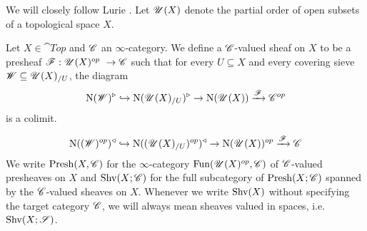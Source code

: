\documentclass[../../thesis.tex]{subfiles}
\begin{document}
We will closely follow Lurie \cite{HTT}.
Let $\mathscr{U}(X)$ denote the partial order of open subsets of a topological space $X$.
\begin{definition}\label{sheaf_on_top}
    Let $X \in \cat{Top}$ and $\mathscr{C}$ an $\infty$-category.
    We define a $\mathscr{C}$-valued sheaf on $X$ to be a presheaf $\F: \Open(X)^{op} \to \C$ such that for every $U\subseteq X$ and every covering sieve $\mathscr{W} \subseteq \mathscr{U}(X)_{/U}$, the diagram
    \[
        \mathrm{N}(\mathscr{W})^{\triangleright} \hookrightarrow \mathrm{N}(\mathscr{U}(X)_{/U})^{\triangleright} \rightarrow \mathrm{N}(\mathscr{U}(X))\xrightarrow{\mathscr{F}}\mathscr{C}^{op}
    \]
    is a colimit.
\end{definition}
\[
    \mathrm{N}((\mathscr{W})^{op})^{\triangleleft} \hookrightarrow \mathrm{N}((\mathscr{U}(X)_{/U})^{op})^{\triangleleft} \rightarrow \mathrm{N}(\mathscr{U}(X))^{op}\xrightarrow{\mathscr{F}}\mathscr{C}
\]
We write $\mathrm{Presh}(X, \mathscr{C})$ for the $\infty$-category $\mathrm{Fun}(\mathscr{U}(X)^{op}, \mathscr{C})$ of $\mathscr{C}$-valued presheaves on $X$ and $\mathrm{Shv}(X;\mathscr{C})$ for the full subcategory of $\mathrm{Presh}(X;\mathscr{C})$ spanned by the $\mathscr{C}$-valued sheaves on $X$.
Whenever we write $\mathrm{Shv}(X)$ without specifying the target category $\mathscr{C}$, we will always mean sheaves valued in spaces, i.e. $\mathrm{Shv}(X;\mathscr{S})$.
\end{document}

